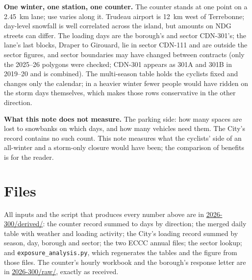 \documentclass[11pt,letterpaper]{article}
\newcommand{\repourl}{https://github.com/OpenMobilityData/Terrebonne-access-requests}
\newcommand{\doc}[2]{\href{\repourl/blob/main/#1}{#2}}
\begin{document}
\textbf{One winter, one station, one counter.} The counter stands at one
point on a 2.45~km lane; use varies along it. Trudeau airport is 12~km
west of Terrebonne; day-level snowfall is well correlated across the
island, but amounts on NDG streets can differ. The loading days are the
borough's and sector CDN-301's; the lane's last blocks, Draper to
Girouard, lie in sector CDN-111 and are outside the sector figures, and
sector boundaries may have changed
between contracts (only the 2025--26 polygons were checked; CDN-301
appears as 301A and 301B in 2019--20 and is combined). The multi-season
table holds the cyclists fixed and changes only the calendar; in a heavier
winter fewer people would have ridden on the storm days themselves, which
makes those rows conservative in the other direction.

\textbf{What this note does not measure.} The parking side: how many
spaces are lost to snowbanks on which days, and how many vehicles need
them. The City's record contains no such count. This note measures what
the cyclists' side of an all-winter and a storm-only closure would have
been; the comparison of benefits is for the reader.

\section{Files}

All inputs and the script that produces every number above are in
\doc{2026-300/derived/}{2026-300/derived/}: the counter record summed to
days by direction; the merged daily table with weather and loading
activity; the City's loading record summed by season, day, borough and
sector; the two ECCC annual files; the sector lookup; and
\texttt{exposure\_analysis.py}, which regenerates the tables and the figure
from those files. The counter's hourly workbook and the borough's response
letter are in \doc{2026-300/raw/}{2026-300/raw/}, exactly as received.
\end{document}
